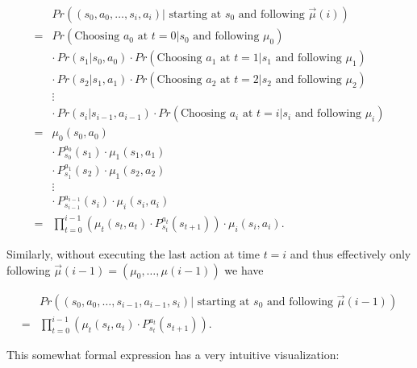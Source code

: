 \documentclass[11pt]{article} %
\begin{document}
\begin{equation}\label{controlLawTraj}
	\begin{array}{ll}
			& Pr((s_0,a_0,\dots, s_i, a_i) | \text{ starting at } s_0 \text{ and following } \vec{\mu}(i)) \\
		 = 	& Pr(\text{Choosing } a_0 \text{ at } t = 0 | s_0 \text{ and following } \mu_0) \\
		 	& \cdot \, Pr(s_1 | s_0, a_0) \cdot Pr(\text{Choosing } a_1 \text{ at } t = 1 | s_1 \text{ and following } \mu_1) \\
		 	& \cdot \, Pr(s_2 | s_1, a_1) \cdot Pr(\text{Choosing } a_2 \text{ at } t = 2 | s_2 \text{ and following } \mu_2) \\
			& \vdots \\
			& \cdot \, Pr(s_i | s_{i-1}, a_{i-1}) \cdot Pr(\text{Choosing } a_i \text{ at } t = i | s_i \text{ and following } \mu_i) \\
		=	& \mu_0(s_0,a_0) \\
		 	& \cdot \, P^{a_0}_{s_0}(s_1) \cdot \mu_1(s_1,a_1) \\
		 	& \cdot \, P^{a_1}_{s_1}(s_2) \cdot \mu_1(s_2,a_2) \\
			& \vdots \\
		 	& \cdot \, P^{a_{i-1}}_{s_{i-1}}(s_i) \cdot \mu_i(s_i,a_i) \\
		=	& \prod_{t=0}^{i-1} \left( \mu_t(s_t,a_t) \cdot P^{a_t}_{s_t}(s_{t+1}) \right) \cdot \mu_i(s_i,a_i).
	\end{array}
\end{equation}

Similarly, without executing the last action at time $t = i$ and thus effectively only following $\vec{\mu}(i-1) = (\mu_0,\dots,\mu(i-1))$ we have

\begin{equation}\label{controlLawTraj2}
	\begin{array}{ll}
			& Pr((s_0,a_0,\dots, s_{i-1}, a_{i-1},s_i) | \text{ starting at } s_0 \text{ and following } \vec{\mu}(i-1)) \\
		=	& \prod_{t=0}^{i-1} \left( \mu_t(s_t,a_t) \cdot P^{a_t}_{s_t}(s_{t+1}) \right).
	\end{array}
\end{equation}

This somewhat formal expression has a very intuitive visualization:
\end{document}
